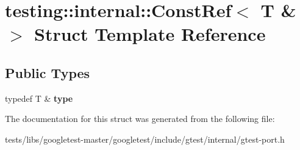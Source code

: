 \hypertarget{structtesting_1_1internal_1_1ConstRef_3_01T_01_6_01_4}{}\section{testing\+:\+:internal\+:\+:Const\+Ref$<$ T \& $>$ Struct Template Reference}
\label{structtesting_1_1internal_1_1ConstRef_3_01T_01_6_01_4}
\subsection*{Public Types}
\begin{DoxyCompactItemize}
\item 
\mbox{\label{structtesting_1_1internal_1_1ConstRef_3_01T_01_6_01_4_a9f664dd25649a0d260cfb1f610c7a349}} 
typedef T \& {\bfseries type}
\end{DoxyCompactItemize}


The documentation for this struct was generated from the following file\+:\begin{DoxyCompactItemize}
\item 
tests/libs/googletest-\/master/googletest/include/gtest/internal/gtest-\/port.\+h\end{DoxyCompactItemize}
